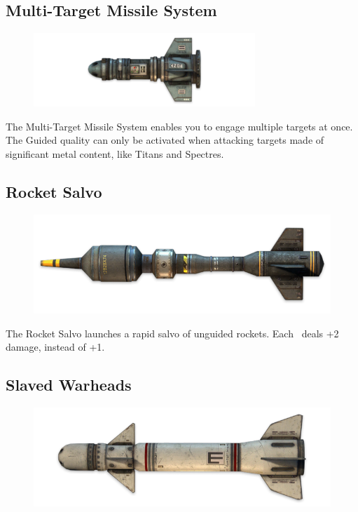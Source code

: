 \documentclass[9pt, openany]{extbook}
\begin{document}
\subsection{Multi-Target Missile System}
\begin{figure}
\vspace*{-2em}
\includegraphics[width=\linewidth]{MultiTargetMissileSystem}
\end{figure}

The Multi-Target Missile System enables you to engage multiple targets at once. The Guided quality can only be activated when attacking targets made of significant metal content, like Titans and Spectres.

\subsection{Rocket Salvo}
\begin{figure}
\vspace*{-2em}
\includegraphics[width=\linewidth]{RocketSalvo}
\end{figure}

The Rocket Salvo launches a rapid salvo of unguided rockets. Each \Success\  deals +2 damage, instead of +1.

\subsection{Slaved Warheads}
\begin{figure}
\vspace*{-2em}
\includegraphics[width=\linewidth]{SlavedWarheads}
\end{figure}
\end{document}
